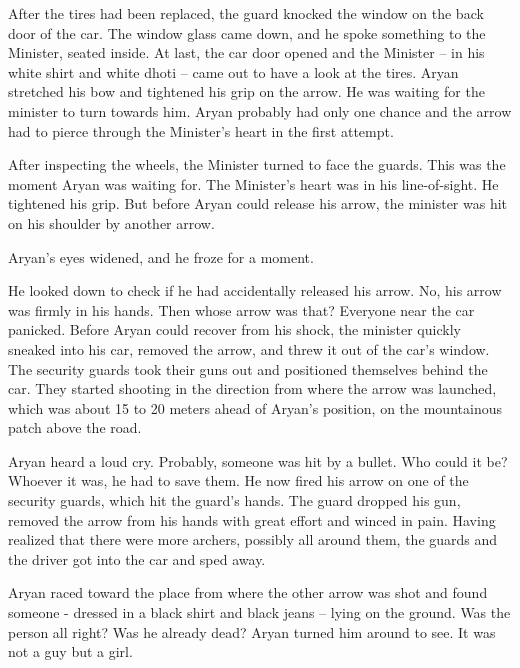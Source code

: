 After the tires had been replaced, the guard knocked the window on the back door
of the car. The window glass came down, and he spoke something to the Minister,
seated inside. At last, the car door opened and the Minister – in his white
shirt and white dhoti – came out to have a look at the tires. Aryan stretched
his bow and tightened his grip on the arrow. He was waiting for the minister to
turn towards him. Aryan probably had only one chance and the arrow had to pierce
through the Minister's heart in the first attempt.

After inspecting the wheels, the Minister turned to face the guards. This was
the moment Aryan was waiting for. The Minister's heart was in his line-of-sight.
He tightened his grip. But before Aryan could release his arrow, the minister
was hit on his shoulder by another arrow.

Aryan's eyes widened, and he froze for a moment.

He looked down to check if he had accidentally released his arrow. No, his arrow
was firmly in his hands. Then whose arrow was that? Everyone near the car
panicked. Before Aryan could recover from his shock, the minister quickly
sneaked into his car, removed the arrow, and threw it out of the car's window.
The security guards took their guns out and positioned themselves behind the
car. They started shooting in the direction from where the arrow was launched,
which was about 15 to 20 meters ahead of Aryan's position, on the mountainous
patch above the road.

Aryan heard a loud cry. Probably, someone was hit by a bullet. Who could it be?
Whoever it was, he had to save them. He now fired his arrow on one of the
security guards, which hit the guard's hands. The guard dropped his gun, removed
the arrow from his hands with great effort and winced in pain. Having realized
that there were more archers, possibly all around them, the guards and the
driver got into the car and sped away.

Aryan raced toward the place from where the other arrow was shot and found
someone - dressed in a black shirt and black jeans – lying on the ground. Was
the person all right? Was he already dead? Aryan turned him around to see. It
was not a guy but a girl.
